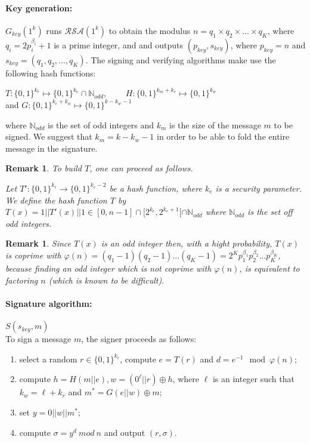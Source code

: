 \documentclass[a4paper,11pt]{article}
\newtheorem{remark}[theorem]{Remark}
\begin{document}
\paragraph{Key generation:}  $G_{key}(1^{k})$ runs $\mathcal{R}\mathcal{S}\mathcal{A}(1^k)$ to obtain the modulus $n=q_1\times q_2\times ...\times q_K$, where $q_i=2p_i^{\beta _i}+1$ is a prime integer, and  and outputs $(p_{key},s_{key})$, where $p_{key}=n$ and $s_{key}=(q_1,q_2,...,q_K)$. The signing and verifying algorithms make use the following hash functions:\\
\begin{center}
$T:\{0,1\}^{k_r}\stackrel{}{\longmapsto}\{0,1\}^{k_e}\cap \mathbb{N}_{odd}$, \ \ \ \ $H:\{0,1\}^{k_m+k_e}\stackrel{}{\longmapsto}\{0,1\}^{k_w}$ \\ and $G:\{0,1\}^{k_e+k_w}\stackrel{}{\longmapsto}\{0,1\}^{k-k_w-1}$
\end{center}
where $\mathbb{N}_{odd}$ is the set of odd integers and $k_m$ is the size of the message $m$ to be signed. We suggest that $k_m=k-k_w-1$ in order to be able to fold the entire message in the signature.


\begin{remark} To build $T$, one can proceed as follows.

Let $ T': \{0, 1\}^{k_{r}} \rightarrow  \{0,1\}^{k_{e}-2}$ be a hash function, where $k_{e}$ is a security parameter. We
define the hash function  $T$  by $T(x)=1||T'(x)||1 \in [0, n-1] \cap [ 2^{k_{e}}, 2^{k_{e}+1}[\cap \mathbb{N}_{odd} $ where $\mathbb{N}_{odd} $ is the set off odd integers.
\end{remark}

\begin{remark}
Since $T(x)$ is an odd integer then, with a hight probability, $T(x)$ is coprime with $\varphi(n)=(q_1-1)(q_2-1)...(q_K-1)=2^Kp^{\beta_{1}}_{1}p^{\beta_{2}}_{2}...p^{\beta_{K}}_{K}$, because finding an odd integer which is not coprime with $\varphi(n)$, is equivalent to factoring $n$ (which is known to be difficult).
\end{remark}

\paragraph{Signature algorithm:}  $S(s_{key},  m)$\\
To sign a message $m$, the signer proceeds as follows:
\begin{enumerate}
\item select a random $r\in\{0,1\}^{k_r}$, compute $e=T(r)$ and $d=e^{-1} \mod \varphi(n)$;
\item compute $h=H(m||e), w=(0^{\ell}||r)\oplus h$, where $\ell$ is an integer such that $k_w=\ell +k_r$ and $m^*=G(e||w)\oplus m$;
\item set $y= 0||w||m^*$;
\item compute $\sigma = y^d \ mod \ n $ and output $(r,\sigma)$.
\end{enumerate}
\end{document}
